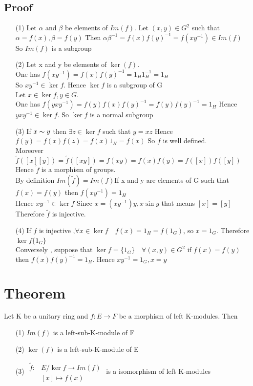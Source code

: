 \documentclass{book}
\begin{document}
\subsection*{Proof}
\begin{itemize}
    \item[(1)] Let $\alpha$ and $ \beta$ be elements of $Im(f)$. Let $(x,y )\in G^2$ such that $\alpha =f(x),\beta=f(y)$ Then $\alpha\beta^{-1}=f(x)f(y)^{-1}=f(xy^{-1})\in Im(f)$ So $Im(f)$ is a subgroup
    \item[(2)] Let x and y be elements of $\ker (f)$. \\One has $f(xy^{-1}) = f(x)f(y)^{-1} = 1_H1_H^{-1} = 1_H$ \\So $xy^{-1}\in \ker f.$ Hence $\ker f$ is a subgroup of G\\Let $x\in \ker f,y\in G$. \\One has $f(yxy^{-1}) = f(y)f(x)f(y)^{-1} = f(y)f(y)^{-1} = 1_H$ Hence $yxy^{-1}\in \ker f$. So $\ker f$ is a normal subgroup
    \item[(3)] If $x\thicksim y$ then $\exists z\in \ker f $ such that $y=xz$ Hence $f(y)=f(x)f(z)=f(x)1_H=f(x)$ So $f$ is well defined. \\Moreover $\widetilde{f}([x][y])=\widetilde{f}([xy])=f(xy)=f(x)f(y)=f([x])f([y])$ Hence $\widetilde{f}$ is a morphism of groups.\\By definition $Im(\widetilde{f})=Im(f)$\quad If x and y are elements of G such that $f(x)=f(y)$ then $f(xy^{-1})=1_H$ \\Hence $xy^{-1}\in \ker f$ Since $x=(xy^{-1})y,x\sin y$ that means $[x]=[y]$ \\Therefore $\widetilde{f}$ is injective.
    \item[(4)] If $f$ is injective ,$\forall x\in \ker f\quad f(x)=1_H=f(1_G)$, so $x=1_G$. Therefore $\ker f\{1_G\}$ \\Conversely , suppose that $\ker f =\{1_G\}\quad \forall (x,y)\in G^2$ if $f(x)=f(y)$ then $f(x)f(y)^{-1}=1_H$. Hence $xy^{-1}=1_G, x=y$
\end{itemize}
\section{Theorem}
Let K be a unitary ring and $f:E\rightarrow F $ be a morphism of left K-modules. Then 
\begin{itemize}
    \item[(1)] $Im(f)$ is a left-sub-K-module of F
    \item[(2)] $\ker(f)$ is a left-sub-K-module of E
    \item[(3)] $\begin{aligned}
        \widetilde{f}:&E/\ker f\rightarrow Im (f)\\
        &[x]\mapsto f(x)
    \end{aligned}$ is a isomorphism of left K-modules
\end{itemize}
\end{document}
